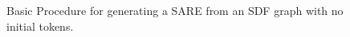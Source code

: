 \begin{figure}[t]
{\begin{minipage}{6.3in}
\end{minipage}}
\caption{Basic Procedure for generating a SARE from an SDF graph with no initial tokens.
\protect\label{fig:sdftosare}}
\end{figure}





